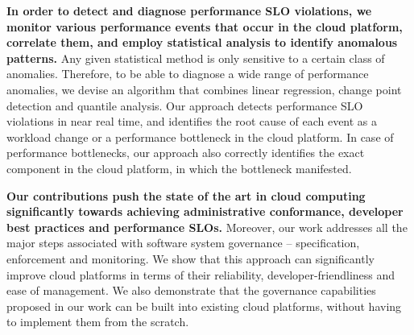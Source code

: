 \textbf{In order to detect and diagnose performance SLO violations,
we monitor various performance events that occur in the cloud platform,
correlate them, and employ statistical analysis to identify anomalous patterns.} Any given statistical
method is only sensitive to a certain class of anomalies. Therefore, to be able to diagnose a wide range of
performance anomalies, we devise an algorithm that combines linear regression, change point
detection and quantile analysis. Our approach detects performance SLO violations in near real time,
and identifies the root cause of each event as a workload change or a performance bottleneck
in the cloud platform. In case of performance bottlenecks, our approach also correctly identifies
the exact component in the cloud platform, in which the bottleneck manifested.

\textbf{Our contributions push the state of the art in cloud computing significantly towards achieving
administrative conformance, developer best practices and performance SLOs.} Moreover,
our work addresses all the major steps associated with software system governance --
specification, enforcement and monitoring. We show that this approach can significantly improve cloud platforms
in terms of their reliability, developer-friendliness and ease of management. We also demonstrate
that the governance capabilities proposed in our work can be built into existing cloud platforms,
without having to implement them from the scratch.